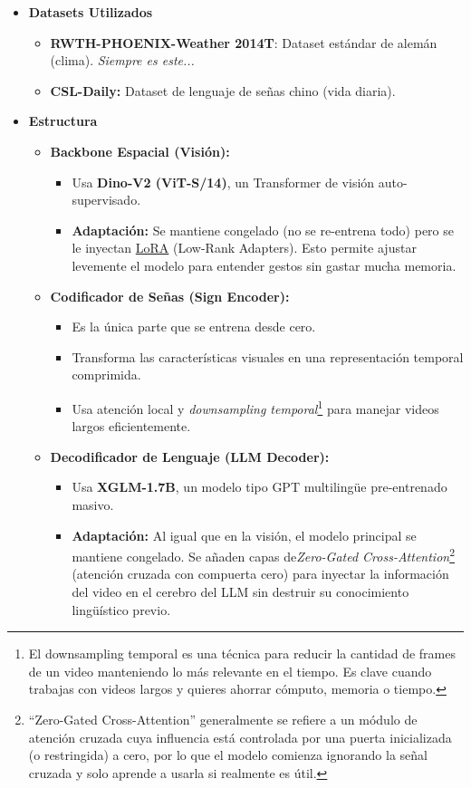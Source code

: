 \documentclass[11pt,a4paper]{article}
\begin{document}
\begin{itemize}
	\item \textbf{Datasets Utilizados}
		\begin{itemize}
			\item \textbf{RWTH-PHOENIX-Weather 2014T}: Dataset estándar de alemán (clima). \emph{Siempre es este...}
			\item \textbf{CSL-Daily:} Dataset de lenguaje de señas chino (vida diaria).
		\end{itemize}
	\item \textbf{Estructura}
	\begin{itemize}
		\item \textbf{Backbone Espacial (Visión):} 
		\begin{itemize}
			\item Usa \textbf{Dino-V2 (ViT-S/14)}, un Transformer de visión auto-supervisado.
			\item \textbf{Adaptación:} Se mantiene congelado (no se re-entrena todo) pero se le inyectan \href{https://www.ibm.com/think/topics/lora}{LoRA} (Low-Rank Adapters). Esto permite ajustar levemente el modelo para entender gestos sin gastar mucha memoria.
		\end{itemize}
		\item \textbf{Codificador de Señas (Sign Encoder):}
		\begin{itemize}
			\item Es la única parte que se entrena desde cero.
			\item Transforma las características visuales en una representación temporal comprimida.
			\item Usa atención local y \emph{downsampling temporal}\footnote{El downsampling temporal es una técnica para reducir la cantidad de frames de un video manteniendo lo más relevante en el tiempo. Es clave cuando trabajas con videos largos y quieres ahorrar cómputo, memoria o tiempo.} para manejar videos largos eficientemente.
		\end{itemize}
		\item \textbf{Decodificador de Lenguaje (LLM Decoder):}
		\begin{itemize}
			\item Usa \textbf{XGLM-1.7B}, un modelo tipo GPT multilingüe pre-entrenado masivo.
			\item \textbf{Adaptación:} Al igual que en la visión, el modelo principal se mantiene congelado. Se añaden capas de\emph{Zero-Gated Cross-Attention}\footnote{“Zero-Gated Cross-Attention” generalmente se refiere a un módulo de atención cruzada cuya influencia está controlada por una puerta inicializada (o restringida) a cero, por lo que el modelo comienza ignorando la señal cruzada y solo aprende a usarla si realmente es útil.} (atención cruzada con compuerta cero) para inyectar la información del video en el cerebro del LLM sin destruir su conocimiento lingüístico previo.

\end{itemize}
\end{itemize}
\end{itemize}
\end{document}
